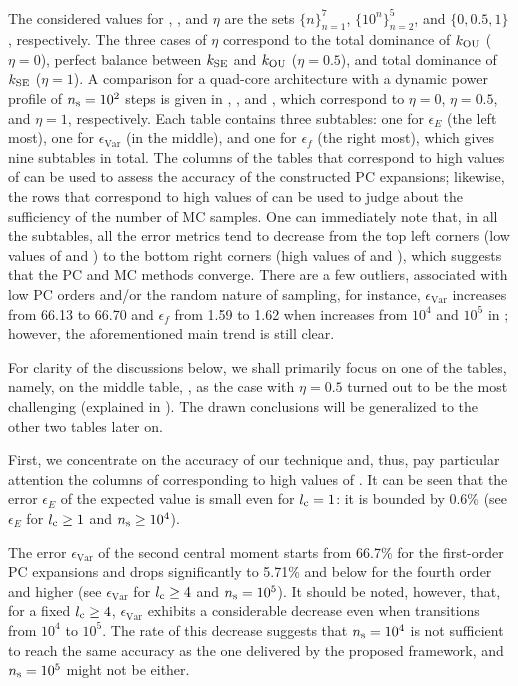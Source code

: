The considered values for \lc, \ns, and $\eta$ are the sets $\{ n \}_{n = 1}^7$,
$\{ 10^n \}_{n = 2}^5$, and $\{ 0, 0.5, 1 \}$, respectively. The three cases of
$\eta$ correspond to the total dominance of $k_{\mathrm{OU}}$ ($\eta = 0$), perfect
balance between $k_{\mathrm{SE}}$ and $k_{\mathrm{OU}}$ ($\eta = 0.5$), and total dominance of
$k_{\mathrm{SE}}$ ($\eta = 1$). A comparison for a quad-core architecture with a dynamic
power profile of ${n_\mathrm{s}} = 10^2$ steps is given in ,
, and , which correspond to $\eta =
0$, $\eta = 0.5$, and $\eta = 1$, respectively. Each table contains three
subtables: one for $\epsilon_E$ (the left most), one for $\epsilon_\mathrm{Var}$
(in the middle), and one for $\epsilon_f$ (the right most), which gives nine
subtables in total. The columns of the tables that correspond to high values of
\ns can be used to assess the accuracy of the constructed PC expansions;
likewise, the rows that correspond to high values of \lc can be used to judge
about the sufficiency of the number of MC samples. One can immediately note
that, in all the subtables, all the error metrics tend to decrease from the top
left corners (low values of \lc and \ns) to the bottom right corners (high
values of \lc and \ns), which suggests that the PC and MC methods converge.
There are a few outliers, associated with low PC orders and/or the random nature
of sampling, for instance, $\epsilon_\mathrm{Var}$ increases from 66.13 to 66.70
and $\epsilon_f$ from 1.59 to 1.62 when \ns increases from $10^4$ and $10^5$ in
; however, the aforementioned main trend is still clear.

For clarity of the discussions below, we shall primarily focus on one of the
tables, namely, on the middle table, , as the case with
$\eta = 0.5$ turned out to be the most challenging (explained in
). The drawn conclusions will be generalized to the other two
tables later on.

First, we concentrate on the accuracy of our technique and, thus, pay particular
attention the columns of  corresponding to high values of
\ns. It can be seen that the error $\epsilon_E$ of the expected value is small
even for ${l_\mathrm{c}} = 1$: it is bounded by 0.6\% (see $\epsilon_E$ for ${l_\mathrm{c}} \geq 1$
and ${n_\mathrm{s}} \geq 10^4$).

The error $\epsilon_\mathrm{Var}$ of the second central moment starts from
66.7\% for the first-order PC expansions and drops significantly to 5.71\% and
below for the fourth order and higher (see $\epsilon_\mathrm{Var}$ for ${l_\mathrm{c}} \geq
4$ and ${n_\mathrm{s}} = 10^5$). It should be noted, however, that, for a fixed ${l_\mathrm{c}} \geq
4$, $\epsilon_\mathrm{Var}$ exhibits a considerable decrease even when \ns
transitions from $10^4$ to $10^5$. The rate of this decrease suggests that ${n_\mathrm{s}}
= 10^4$ is not sufficient to reach the same accuracy as the one delivered by the
proposed framework, and ${n_\mathrm{s}} = 10^5$ might not be either.

